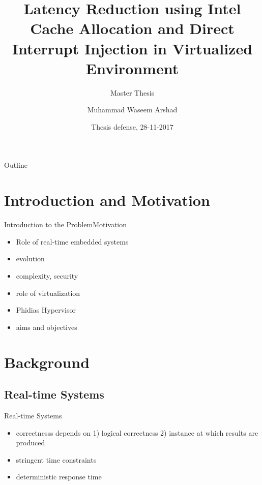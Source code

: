 \documentclass[10pt,hyperref={hyperfootnotes=false}, xcolor={usenames, dvipsnames}]{beamer}
\title{Latency Reduction using Intel Cache Allocation
and Direct Interrupt Injection in Virtualized
Environment}
\subtitle{Master Thesis}
\author{Muhammad Waseem Arshad\inst{1}} %
\institute[TUB] %
{
  \inst{1}
  Department of Security in Telecommunications\\
  {Technische Universit{\"a}t Berlin}
}
\date{Thesis defense, 28-11-2017}
\begin{document}
\begin{frame}
  \titlepage
\end{frame}

\begin{frame}[allowframebreaks]{Outline}
  \small\tableofcontents
\end{frame}

\section{Introduction and Motivation}
\begin{frame}{Introduction to the Problem}{Motivation}
  \begin{itemize}
  \item {Role of real-time embedded systems \pause{}}
  \item {evolution \pause{}}
  \item {complexity, security \pause{}}
  \item {role of virtualization \pause{}}
  \item {Phidias Hypervisor \pause{}}
  \item {aims and objectives \pause{}}
  \end{itemize}
\end{frame}

\section{Background}

\subsection{Real-time Systems}
\begin{frame}{Real-time Systems}
  \begin{itemize}
  \item {correctnesss depends on 1) logical correctness 2) instance at which results are produced}
  \item {stringent time constraints}
  \item {deterministic response time}
  \end{itemize}
	\begingroup
	
	\endgroup
\end{frame}
\end{document}
